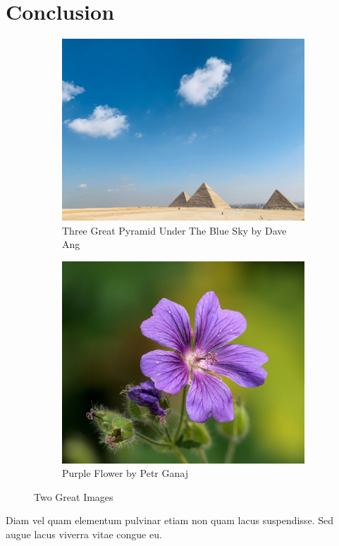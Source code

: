 \documentclass[12pt]{article}
\begin{document}
\blindtext



\section{Conclusion}



\blindtext


\begin{figure}[ht]
    \centering
    \begin{subfigure}{0.4\textwidth}
        \centering
        \includegraphics[width=\textwidth]{img/dave-ang-pyramid.jpg}
        \caption{Three Great Pyramid Under The Blue Sky by Dave Ang}
        \label{fig:great_pyramid}
    \end{subfigure}
    \hfill
    \begin{subfigure}{0.4\textwidth}
        \centering
        \includegraphics[width=\textwidth]{img/ganajp-purple-flower.jpg}
        \caption{Purple Flower by Petr Ganaj}
        \label{fig:purple_flower}
    \end{subfigure}
    \caption{Two Great Images}
    \label{fig:two_great_images}
\end{figure}


Diam vel quam elementum pulvinar etiam non quam lacus suspendisse.
Sed augue lacus viverra vitae congue eu.
\end{document}

